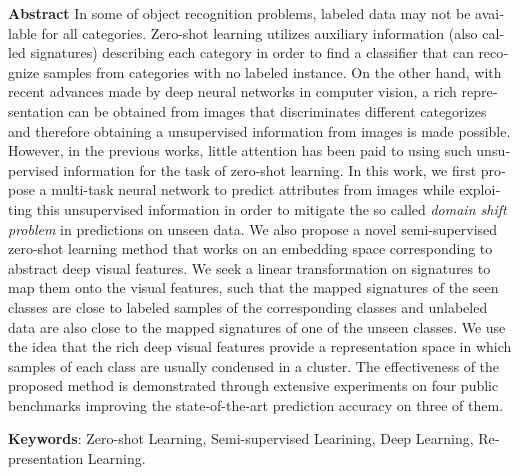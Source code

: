 


\pagestyle{empty}
\begin{latin}
  \textbf{Abstract}
In some of object recognition problems, labeled data may not be available for all categories.
 Zero-shot learning utilizes auxiliary information (also called signatures)
 describing each category in order to find a classifier that can recognize samples
from categories with no labeled instance. %
On the other hand, with recent advances made by deep neural networks in computer vision, a rich representation can be obtained from images
that discriminates different categorizes and therefore obtaining a unsupervised information from images is made possible.
However, in the previous works, little attention has been paid to using such unsupervised information for the task of zero-shot learning.
In this work, we first propose a multi-task neural network to predict attributes from images while exploiting this unsupervised information
in order to mitigate the so called \textit{domain shift problem} in predictions on unseen data.
We also propose a novel semi-supervised zero-shot learning method that works on an embedding space corresponding to
abstract deep visual features. We seek a linear transformation on signatures to map them onto the visual features,
such that the mapped signatures of the seen classes are close to labeled samples of the corresponding
classes and unlabeled data are also close to the mapped signatures of one of the unseen classes.
 We use the idea that the rich deep visual features provide a representation
 space in which samples of each class are usually condensed in a cluster. The effectiveness of the proposed method is demonstrated through extensive
experiments on four public benchmarks improving the state-of-the-art prediction accuracy on three of them.

\bigskip\noindent\textbf{Keywords}:
Zero-shot Learning, Semi-supervised Learining, Deep Learning, Representation Learning.
\end{latin}

\newpage
